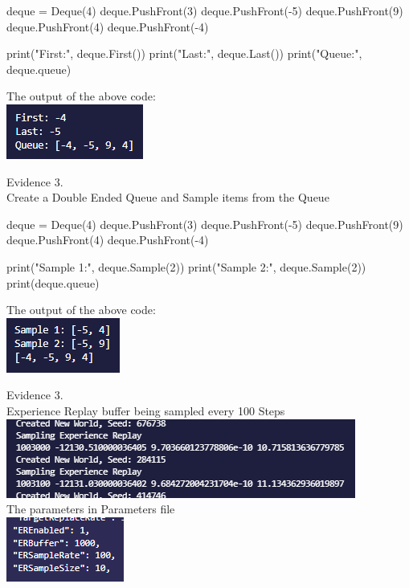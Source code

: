 \begin{center}
    \begin{pythoncode}
deque = Deque(4)
deque.PushFront(3)
deque.PushFront(-5)
deque.PushFront(9)
deque.PushFront(4)
deque.PushFront(-4)

print("First:", deque.First())
print("Last:", deque.Last())
print("Queue:", deque.queue)
    \end{pythoncode}

    The output of the above code: \\
    \includegraphics{Images/Testing/T3.9.1.PNG}
    \vspace{1cm}

    {\large Evidence 3.\rn } \\ 
    \vspace{0.3cm}
    Create a Double Ended Queue and Sample items from the Queue \\

    \begin{pythoncode}
deque = Deque(4)
deque.PushFront(3)
deque.PushFront(-5)
deque.PushFront(9)
deque.PushFront(4)
deque.PushFront(-4)

print("Sample 1:", deque.Sample(2))
print("Sample 2:", deque.Sample(2))
print(deque.queue)
    \end{pythoncode}

    The output of the above code: \\
    \includegraphics{Images/Testing/T3.10.1.PNG}
    \vspace{1cm}

    {\large Evidence 3.\rn } \\ 
    \vspace{0.3cm}
    Experience Replay buffer being sampled every 100 Steps \\
    \includegraphics{Images/Testing/T3.9.3.PNG} \\
    The parameters in Parameters file \\
    \includegraphics{Images/Testing/T3.9.4.PNG}
    \vspace{1cm}


\end{center}
